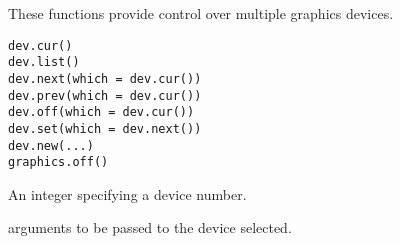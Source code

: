 %
\begin{Description}\relax
These functions provide control over multiple graphics devices.
\end{Description}
%
\begin{Usage}
\begin{verbatim}
dev.cur()
dev.list()
dev.next(which = dev.cur())
dev.prev(which = dev.cur())
dev.off(which = dev.cur())
dev.set(which = dev.next())
dev.new(...)
graphics.off()
\end{verbatim}
\end{Usage}
%
\begin{Arguments}
\begin{ldescription}
\item[\code{which}] An integer specifying a device number.
\item[\code{...}] arguments to be passed to the device selected.
\end{ldescription}
\end{Arguments}
%
